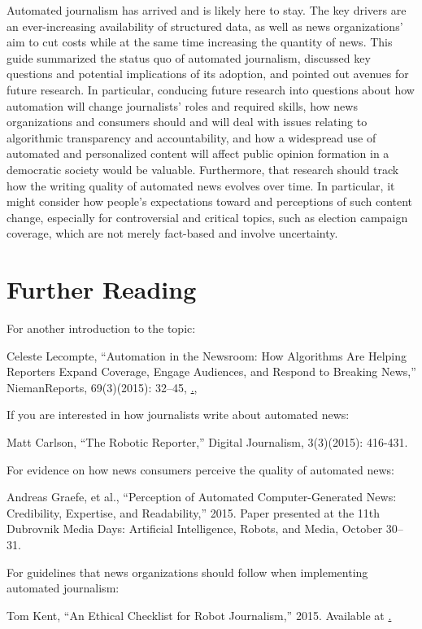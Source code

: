 \documentclass[notoc, symmetric, nobib, nols]{towcenter-guideto-book}
\begin{document}
Automated journalism has arrived and is likely here to stay. The key drivers are an ever-increasing availability of structured data, as well as news organizations' aim to cut costs while at the same time increasing the quantity of news. This guide summarized the status quo of automated journalism, discussed key questions and potential implications of its adoption, and pointed out avenues for future research. In particular, conducing future research into questions about how automation will change journalists' roles and required skills, how news organizations and consumers should and will deal with issues relating to algorithmic transparency and accountability, and how a widespread use of automated and personalized content will affect public opinion formation in a democratic society would be valuable. Furthermore, that research should track how the writing quality of automated news evolves over time. In particular, it might consider how people's expectations toward and perceptions of such content change, especially for controversial and critical topics, such as election campaign coverage, which are not merely fact-based and involve uncertainty.

\chapter{Further Reading}

For another introduction to the topic:

Celeste Lecompte, ``Automation in the Newsroom: How Algorithms Are Helping Reporters Expand Coverage, Engage Audiences, and Respond to Breaking News,'' NiemanReports, 69(3)(2015): 32--45, \href{http://niemanreports.org/articles/automation-in-the-newsroom/}., 

If you are interested in how journalists write about automated news:

Matt Carlson, ``The Robotic Reporter,'' Digital Journalism, 3(3)(2015): 416-431. 

For evidence on how news consumers perceive the quality of automated news:

Andreas Graefe, et al., ``Perception of Automated Computer-Generated News: Credibility, Expertise, and Readability,'' 2015. Paper presented at the 11th Dubrovnik Media Days: Artificial Intelligence, Robots, and Media, October 30--31. 

For guidelines that news organizations should follow when implementing automated journalism:

Tom Kent, ``An Ethical Checklist for Robot Journalism,'' 2015. Available at \href{https://medium.com/@tjrkent/an-ethical-checklist-for-robot-journalism-1f41dcbd7be2}.   
\end{document}

